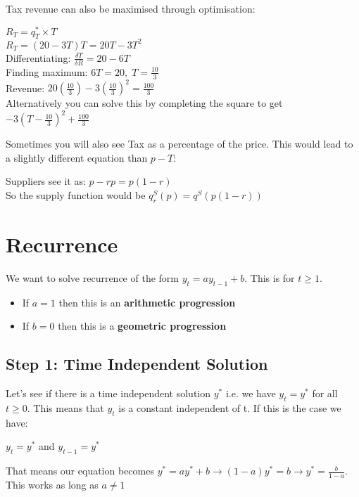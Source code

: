 \documentclass[12pt, letterpaper]{article}
\begin{document}
Tax revenue can also be maximised through optimisation:
\begin{center}
	$R_T = q^*_T\times T$\\
	$R_T = (20-3T)T = 20T-3T^2$\\
	Differentiating: $\frac{\delta T}{\delta R} = 20 - 6T$\\
	Finding maximum: $6T = 20,\; T = \frac{10}{3}$\\
	Revenue: $20(\frac{10}{3}) - 3(\frac{10}{3})^2 = \frac{100}{3}$\\
	Alternatively you can solve this by completing the square to get $-3(T-\frac{10}{3})^2 + \frac{100}{3}$
\end{center}
Sometimes you will also see Tax as a percentage of the price. This would lead to a slightly different equation than $p-T$:
\begin{center}
	Suppliers see it as: $p-rp=p(1-r)$\\
	So the supply function would be $q^S_r(p)=q^S(p(1-r))$
\end{center}

\section{Recurrence}
We want to solve recurrence of the form $y_t=ay_{t-1}+b$. This is for $t \geq 1$.
\begin{itemize}
	\item If $a=1$ then this is an \textbf{arithmetic progression}
	\item If $b=0$ then this is a \textbf{geometric progression}
\end{itemize}
\subsection{Step 1: Time Independent Solution}
Let's see if there is a time independent solution $y^*$ i.e. we have $y_t = y^*$ for all $t \geq 0$.
This means that $y_t$ is a constant independent of t. If this is the case we have:
\begin{center}
	$y_t = y^*$ and $y_{t-1} = y^*$
\end{center}
That means our equation becomes $y^* = ay^* + b \rightarrow (1-a)y^* = b \rightarrow y^* = \frac{b}{1-a}$.
This works as long as $a \neq 1$
\end{document}
